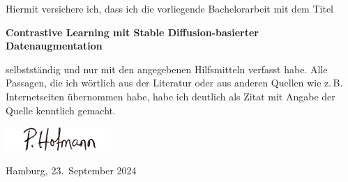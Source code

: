 Hiermit versichere ich, dass ich die vorliegende Bachelorarbeit mit dem Titel
\begin{center}
  \textbf{Contrastive Learning mit Stable Diffusion-basierter Datenaugmentation}
\end{center}
selbstständig und nur mit den angegebenen Hilfsmitteln verfasst habe.  Alle
Passagen, die ich wörtlich aus der Literatur oder aus anderen Quellen wie
z.\,B. Internetseiten übernommen habe, habe ich deutlich als Zitat mit Angabe
der Quelle kenntlich gemacht.

\vspace{1cm}

\includegraphics[width=4cm]{Unterschrift.jpg}

Hamburg, 23.\ September 2024
